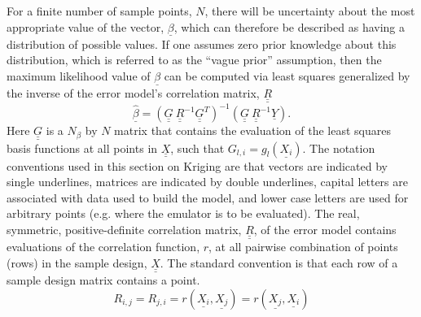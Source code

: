\documentclass{article}
\begin{document}
For a finite number of sample points, $N$, there will be uncertainty
about the most appropriate value of the vector, $\underline{\beta}$,
which can therefore be described as having a distribution of possible
values.  If one assumes zero prior knowledge about this distribution,
which is referred to as the ``vague prior'' assumption, then the
maximum likelihood value of $\underline{\beta}$ can be computed via
least squares generalized by the inverse of the error model's
correlation matrix, $\underline{\underline{R}}$
\begin{displaymath}
\underline{\hat{\beta}}=\left(\underline{\underline{G}}\ \underline{\underline{R}}^{-1}\underline{\underline{G}}^T\right)^{-1}\left(\underline{\underline{G}}\ \underline{\underline{R}}^{-1}\underline{Y}\right).
\end{displaymath}
Here $\underline{\underline{G}}$ is a $N_\beta$ by $N$ matrix that 
contains the evaluation of the least 
squares basis functions at all points in $\underline{\underline{X}}$, 
such that $G_{l,i}=g_l\left(\underline{X_i}\right)$.  
The notation conventions used in this section on Kriging are that vectors
are indicated by single underlines, matrices are indicated by double underlines,
capital letters are associated with data used to build the model, and lower 
case letters are used for arbitrary points (e.g. where the emulator
is to be evaluated).  The real, symmetric, positive-definite correlation 
matrix, $\underline{\underline{R}}$, of the error model contains evaluations 
of the correlation function, $r$, at all pairwise combination of points 
(rows) in the sample design, $\underline{\underline{X}}$.  The standard 
convention is that each row of a sample design matrix contains a point.
\begin{displaymath}
R_{i,j}=R_{j,i}=r\left(\underline{X_i},\underline{X_j}\right)=r\left(\underline{X_j},\underline{X_i}\right)
\end{displaymath}
\end{document}
